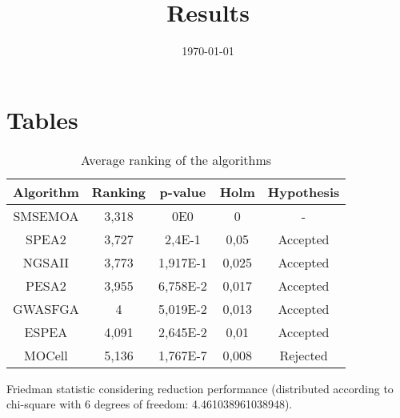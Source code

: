 \documentclass{article}
\title{Results}
\author{}
\date{\today}
\begin{document}
\oddsidemargin 0in \topmargin 0in\maketitle

\section{Tables}
\begin{table}[!htp]
\centering
\begin{tabular}{c|c|c|c|c}
Algorithm&Ranking&p-value&Holm&Hypothesis\\
\hline
SMSEMOA & 3,318 & 0E0 & 0 & -\\
SPEA2 & 3,727 & 2,4E-1 & 0,05 & Accepted\\
NGSAII & 3,773 & 1,917E-1 & 0,025 & Accepted\\
PESA2 & 3,955 & 6,758E-2 & 0,017 & Accepted\\
GWASFGA & 4 & 5,019E-2 & 0,013 & Accepted\\
ESPEA & 4,091 & 2,645E-2 & 0,01 & Accepted\\
MOCell & 5,136 & 1,767E-7 & 0,008 & Rejected\\
\end{tabular}
\caption{Average ranking of the algorithms}
\end{table}


Friedman statistic considering reduction performance (distributed according to chi-square with 6 degrees of freedom: 4.461038961038948).
\end{document}
